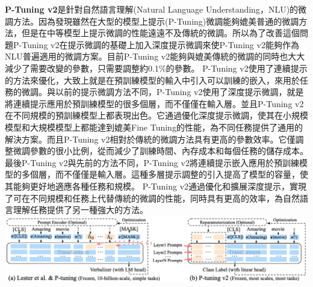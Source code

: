 \documentclass[8pt,a4paper,新細明體,UTF8,natbib]{article}
\begin{document}
\begin{CJK*}{UTF8}{bsmi}
	\textbf{P-Tuning v2}是針對自然語言理解(Natural Language Understanding，NLU)的微調方法。因為發現雖然在大型的模型上提示(P-Tuning)微調能夠媲美普通的微調方法，但是在中等模型上提示微調的性能遠遠不及傳統的微調。所以為了改善這個問題P-Tuning v2在提示微調的基礎上加入深度提示微調來使P-Tuning v2能夠作為NLU普遍適用的微調方案。目前P-Tuning v2能夠與媲美傳統的微調的同時也大大減少了需要改變的參數，只需要調整約0.1\%的參數。
	P-Tuning v2使用了連續提示的方法來優化，大致上就是在預訓練模型的輸入中引入可以訓練的嵌入，來用於任務的微調。與以前的提示微調方法不同，P-Tuning v2使用了深度提示微調，就是將連續提示應用於預訓練模型的很多個層，而不僅僅在輸入層。並且P-Tuning v2在不同規模的預訓練模型上都表現出色。它通過優化深度提示微調，使其在小規模模型和大規模模型上都能達到媲美Fine Tuning的性能，為不同任務提供了通用的解決方案。而且P-Tuning v2相對於傳統的微調方法具有更高的參數效率。它僅調整微調參數的很小比例，從而減少了訓練時間、內存成本和每個任務的儲存成本。最後P-Tuning v2與先前的方法不同，P-Tuning v2將連續提示嵌入應用於預訓練模型的多個層，而不僅僅是輸入層。這種多層提示調整的引入提高了模型的容量，使其能夠更好地適應各種任務和規模。\cite{houlsby2019parameterefficient}
	P-Tuning v2通過優化和擴展深度提示，實現了可在不同規模和任務上代替傳統的微調的性能，同時具有更高的效率，為自然語言理解任務提供了另一種強大的方法。\cite{liu2022ptuning}
	\includegraphics[width=\textwidth]{community_8263c05}


\end{CJK*}
\end{document}
